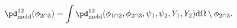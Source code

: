 \begin{equation}
  \pd_{\text{meld}}^{12}(\phi_{2 \cap 3}) = 
  \int
    \pd_{\text{meld}}^{12}(\phi_{1 \cap 2}, \phi_{2 \cap 3}, \psi_{1}, \psi_{2}, Y_{1}, Y_{2})
  \text{d}
  \Omega \setminus \phi_{2 \cap 3}.
  \label{eqn:strange-marginal-definition}
\end{equation}